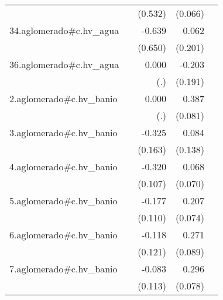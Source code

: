 {\begin{longtable}{l*{4}{D{.}{.}{-1}}}
            &                     &     (0.532)         &     (0.066)         &                     \\
\addlinespace
34.aglomerado#c.hv\_agua&                     &      -0.639         &       0.062         &                     \\
            &                     &     (0.650)         &     (0.201)         &                     \\
\addlinespace
36.aglomerado#c.hv\_agua&                     &       0.000         &      -0.203         &                     \\
            &                     &         (.)         &     (0.191)         &                     \\
\addlinespace
2.aglomerado#c.hv\_banio&                     &       0.000         &       0.387\sym{***}&                     \\
            &                     &         (.)         &     (0.081)         &                     \\
\addlinespace
3.aglomerado#c.hv\_banio&                     &      -0.325\sym{*}  &       0.084         &                     \\
            &                     &     (0.163)         &     (0.138)         &                     \\
\addlinespace
4.aglomerado#c.hv\_banio&                     &      -0.320\sym{**} &       0.068         &                     \\
            &                     &     (0.107)         &     (0.070)         &                     \\
\addlinespace
5.aglomerado#c.hv\_banio&                     &      -0.177         &       0.207\sym{**} &                     \\
            &                     &     (0.110)         &     (0.074)         &                     \\
\addlinespace
6.aglomerado#c.hv\_banio&                     &      -0.118         &       0.271\sym{**} &                     \\
            &                     &     (0.121)         &     (0.089)         &                     \\
\addlinespace
7.aglomerado#c.hv\_banio&                     &      -0.083         &       0.296\sym{***}&                     \\
            &                     &     (0.113)         &     (0.078)         &                     \\

\end{longtable}}
